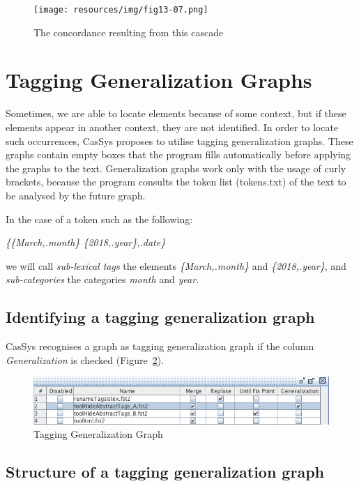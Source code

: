 \begin{figure}[!htb]
  \centering
  \texttt{[image: resources/img/fig13-07.png]}
  \caption{The concordance resulting from this cascade}
  \label{fig13-07}
\end{figure}


\section{Tagging Generalization Graphs}
\label{graph-generalization}
Sometimes, we are able to locate elements because of some context, but if these elements appear
in another context, they are not identified. In order to locate such occurrences, CasSys proposes to
utilise tagging generalization graphs. These graphs contain empty boxes that the program fills automatically
before applying the graphs to the text. Generalization graphs work only with the usage
of curly brackets, because the program consults the token list (tokens.txt) of the text to be analysed by the
future graph.

\bigskip
\noindent In the case of a token such as the following:

\bigskip
\emph{\{\{March,.month\} \{2018,.year\},.date\}}

\bigskip
\noindent we will call \emph{sub-lexical tags} the elements \emph{\{March,.month\}} and \emph{\{2018,.year\}}, and \emph{sub-categories} the categories \textit{month} and \textit{year}.

\subsection{Identifying a tagging generalization graph}
CasSys recognises a graph as tagging generalization graph if the column \emph{Generalization} is
checked (Figure~\ref{fig12-3}).
\begin{figure}[!htb]
  \centering
  \includegraphics[width=15cm]{resources/img/fig12-3.png}
  \caption{Tagging Generalization Graph}
  \label{fig12-3}
\end{figure}

\subsection{Structure of a tagging generalization graph}
